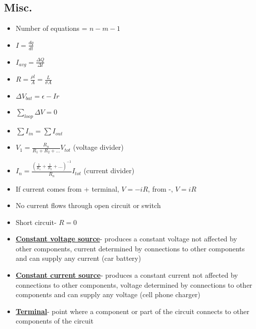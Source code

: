 \documentclass [12pt] {article}
\begin{document}
\begin{multicols*}{2}
\section{Misc.}
	\begin{itemize}
		\item Number of equations = $n - m - 1$ \\
		\item $I = \frac{dq}{dt}$ \\
		\item $I_{avg} = \frac{\Delta Q}{\Delta t}$ \\
		\item $R = \frac{\rho l}{A} = \frac{L}{\sigma A}$ \\
		\item $\Delta V_{bat} = \epsilon - Ir$ \\
		\item $\sum_{loop}\Delta V = 0$ \\
		\item $\sum I_{in} = \sum I_{out}$ \\ 
		\item $V_1 = \frac{R_n}{R_1 + R_2 + \dots}V_{tot} $ (voltage divider) \\
		\item $I_n = \frac{\left(\frac{1}{R_1} + \frac{1}{R_2} + \dots\right)^{-1}}{R_n}I_{tot}$ (current divider) \\
		\item If current comes from + terminal, $V = -iR$, from -, $V = iR$ \\
		\item No current flows through open circuit or switch \\
		\item Short circuit- $R = 0$ \\
		\item \underline{\textbf{Constant voltage source}}- produces a constant voltage not affected by other components, current determined by connections to other components and can supply any current (car battery)\\
		\item \underline{\textbf{Constant current source}}- produces a constant current not affected by connections to other components, voltage determined by connections to other components and can supply any voltage (cell phone charger) \\
		\item \underline{\textbf{Terminal}}- point where a component or part of the circuit connects to other components of the circuit \\

\end{itemize}
\end{multicols*}
\end{document}
